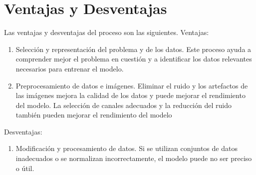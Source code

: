 \section{Ventajas y Desventajas}\label{sec:advantages_disadvantages}
Las ventajas y desventajas del proceso son las siguientes. 
Ventajas: 
\begin{enumerate}
   \item Selección y representación del problema y de los datos. 
   Este proceso ayuda a comprender mejor el problema en cuestión y a identificar los datos relevantes necesarios para entrenar el modelo.
   \item Preprocesamiento de datos e imágenes. 
   Eliminar el ruido y los artefactos de las imágenes mejora la calidad de los datos y puede mejorar el rendimiento del modelo. 
   La selección de canales adecuados y la reducción del ruido también pueden mejorar el rendimiento del modelo
\end{enumerate}  
Desventajas: 	
\begin{enumerate}
   \item Modificación y procesamiento de datos. Si se utilizan conjuntos de datos inadecuados o se normalizan incorrectamente, el modelo puede no ser preciso o útil.
\end{enumerate} 

